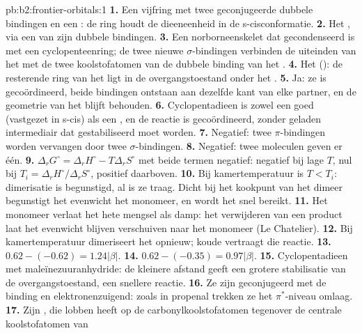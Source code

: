\begin{solution}{pb:b2:frontier-orbitals:1}
\textbf{1.} Een vijfring met twee geconjugeerde dubbele bindingen en een : de ring
houdt de dieeneenheid in de s-cisconformatie.
\textbf{2.} Het , via een van zijn dubbele bindingen.
\textbf{3.} Een norborneenskelet dat gecondenseerd is met een cyclopenteenring; de twee nieuwe $\sigma$-bindingen verbinden
de uiteinden van het  met de twee koolstofatomen van de dubbele binding van het .
\textbf{4.} Het  (): de resterende ring van het  ligt in de
overgangstoestand onder het .
\textbf{5.} Ja: ze is gecoördineerd, beide bindingen ontstaan aan dezelfde kant van elke partner, en de
geometrie van het  blijft behouden.
\textbf{6.} Cyclopentadieen is zowel een goed  (vastgezet in s-cis) als een , en de
reactie is gecoördineerd, zonder geladen intermediair dat gestabiliseerd moet worden.
\textbf{7.} Negatief: twee $\pi$-bindingen worden vervangen door twee $\sigma$-bindingen.
\textbf{8.} Negatief: twee moleculen geven er één.
\textbf{9.} $\Delta_r G^\circ = \Delta_r H^\circ - T\Delta_r S^\circ$ met beide termen negatief: negatief bij lage
$T$, nul bij $T_i = \Delta_r H^\circ/\Delta_r S^\circ$, positief daarboven.
\textbf{10.} Bij kamertemperatuur is $T < T_i$: dimerisatie is begunstigd, al is ze traag. Dicht bij
het kookpunt van het dimeer begunstigt het evenwicht het monomeer, en wordt het
snel bereikt.
\textbf{11.} Het monomeer verlaat het hete mengsel als damp: het verwijderen van een product laat het
evenwicht blijven verschuiven naar het monomeer (Le Chatelier).
\textbf{12.} Bij kamertemperatuur dimeriseert het opnieuw; koude vertraagt die reactie.
\textbf{13.} $0.62 - (-0.62) = 1.24|\beta|$.
\textbf{14.} $0.62 - (-0.35) = 0.97|\beta|$.
\textbf{15.} Cyclopentadieen met maleïnezuuranhydride: de kleinere afstand geeft een grotere
stabilisatie van de overgangstoestand, een snellere reactie.
\textbf{16.} Ze zijn geconjugeerd met de binding  en elektronenzuigend: zoals in
propenal trekken ze het $\pi^*$-niveau omlaag.
\textbf{17.} Zijn , die lobben heeft op de carbonylkoolstofatomen tegenover de centrale koolstofatomen van

\end{solution}
